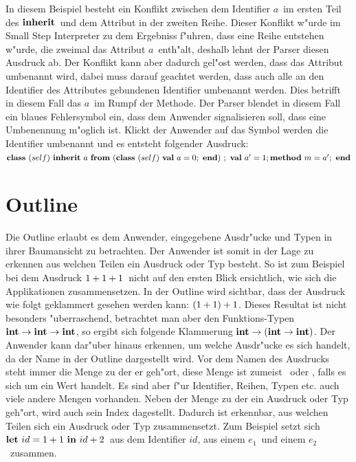 In diesem Beispiel besteht ein Konflikt zwischen dem Identifier \glqq$a$\grqq\ 
im ersten Teil des \glqq$\binherit$\grqq\ und dem Attribut in der zweiten Reihe. Dieser 
Konflikt w"urde im Small Step Interpreter zu dem Ergebniss f"uhren, dass eine Reihe
entstehen w"urde, die zweimal das Attribut \glqq$a$\grqq\ enth"alt, deshalb
lehnt der Parser diesen Ausdruck ab. Der Konflikt kann aber dadurch gel"ost
werden, dass das Attribut umbenannt wird, dabei muss darauf geachtet werden,
dass auch alle an den Identifier des Attributes gebundenen Identifier umbenannt
werden. Dies betrifft in diesem Fall das \glqq$a$\grqq\ im Rumpf der Methode.
Der Parser blendet in diesem Fall ein blaues Fehlersymbol ein, dass dem Anwender
signalisieren soll, dass eine Umbenennung m"oglich ist. Klickt der Anwender auf
das Symbol werden die Identifier umbenannt und es entsteht folgender Ausdruck:\\[2mm]
\glqq$\class{self}{\inherit{a}{(\class{self}{\val{a}{0}})}{\val{a'}{1} \method{m}{a'}}}$\grqq


\section {Outline}
\label{Outline}
Die Outline erlaubt es dem Anwender, eingegebene Ausdr"ucke und Typen
in ihrer Baumansicht zu betrachten. Der Anwender ist somit in der Lage
zu erkennen aus welchen Teilen ein Ausdruck oder Typ besteht. So ist zum
Beispiel bei dem Ausdruck \glqq$\infix{+}{\infix{+}{1}{1}}{1}$\grqq\ nicht 
auf den ersten Blick ersichtlich, wie sich die Applikationen zusammensetzen. 
In der Outline wird sichtbar, dass der Ausdruck wie folgt geklammert gesehen
werden kann: \glqq$\infix{+}{(\infix{+}{1}{1})}{1}$\grqq. Dieses Resultat ist nicht
besonders "uberraschend, betrachtet man aber den Funktions-Typen
\glqq$\arrowtype{\inttype}{\arrowtype{\inttype}{\inttype}}$\grqq, so ergibt sich
folgende Klammerung \glqq$\arrowtype{\inttype}{(\arrowtype{\inttype}{\inttype})}$\grqq.
Der Anwender kann dar"uber hinaus erkennen, um welche Ausdr"ucke es sich
handelt, da der Name in der Outline dargestellt wird. Vor dem Namen des
Ausdrucks steht immer die Menge zu der er geh"ort, diese Menge ist zumeist
\glqq{\bf e}\grqq\ oder \glqq{\bf v}\grqq, falls es sich um ein Wert handelt.
Es sind aber f"ur Identifier, Reihen, Typen etc. auch viele andere Mengen
vorhanden. Neben der Menge zu der ein Ausdruck oder Typ geh"ort, wird auch
sein Index dagestellt. Dadurch ist erkennbar, aus welchen Teilen sich ein
Ausdruck oder Typ zusammensetzt. Zum Beispiel setzt sich 
\glqq$\bli{id}{1+1}{id+2}$\grqq\ aus dem Identifier \glqq$id$\grqq, aus einem
\glqq$e_1$\grqq\ und einem \glqq$e_2$\grqq\ zusammen.

